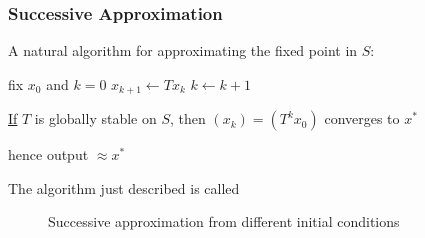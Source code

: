 \begin{frame}
    \frametitle{Successive Approximation}

    A natural algorithm for approximating
    the fixed point in $S$:


    \begin{algorithm}[H]
      \DontPrintSemicolon
      fix $x_0$ and $k=0$ \;
      {
          $x_{k+1} \leftarrow T x_k$ \;
          $k \leftarrow k+1$ \;
      }
    \end{algorithm}

    \underline{If} $T$ is globally stable on $S$, then $(x_k) = (T^k x_0)$ converges
    to $x^*$

    \begin{center}
        hence output $\approx x^*$
    \end{center}

    The algorithm just described is called 

    
\end{frame}


\begin{frame}
    

\end{frame}

\begin{frame}
    

    \begin{figure}
        \centering
        \caption{\label{f:linear_iter_fig_1} 
            Successive approximation from different initial conditions}
    \end{figure}

\end{frame}


